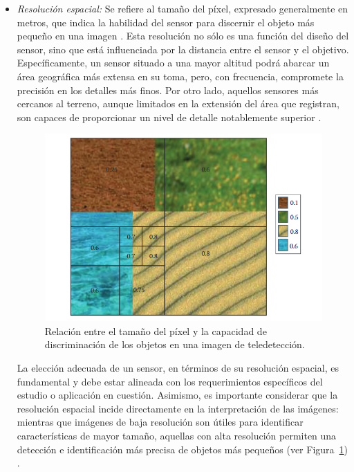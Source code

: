 \begin{itemize}
    \item \textit{Resolución espacial:} Se refiere al tamaño del píxel, expresado generalmente en metros, que indica la habilidad del sensor para discernir el objeto más pequeño en una imagen \cite{chuvieco2016fundamentals}. Esta resolución no sólo es una función del diseño del sensor, sino que está influenciada por la distancia entre el sensor y el objetivo. Específicamente, un sensor situado a una mayor altitud podrá abarcar un área geográfica más extensa en su toma, pero, con frecuencia, compromete la precisión en los detalles más finos. Por otro lado, aquellos sensores más cercanos al terreno, aunque limitados en la extensión del área que registran, son capaces de proporcionar un nivel de detalle notablemente superior \cite{canada2007fundamentals}.

          \begin{figure}[H]
              \begin{center}
                  \includegraphics[width=1\textwidth]{Images/ResolucionEspacial.png}
              \end{center}
              \caption{Relación entre el tamaño del píxel y la capacidad de discriminación de los objetos en una imagen de teledetección.}
              \label{fig:ResolucionEspacial}
          \end{figure}

          La elección adecuada de un sensor, en términos de su resolución espacial, es fundamental y debe estar alineada con los requerimientos específicos del estudio o aplicación en cuestión. Asimismo, es importante considerar que la resolución espacial incide directamente en la interpretación de las imágenes: mientras que imágenes de baja resolución son útiles para identificar características de mayor tamaño, aquellas con alta resolución permiten una detección e identificación más precisa de objetos más pequeños (ver Figura~\ref{fig:ResolucionEspacial}) \cite{canada2007fundamentals}.


\end{itemize}
